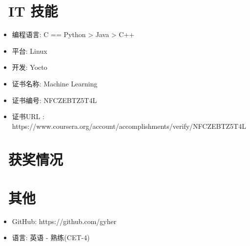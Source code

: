 \documentclass{resume}
\begin{document}


\section{\faCogs\ IT 技能}
\begin{itemize}[parsep=0.5ex]
  \item 编程语言: C == Python > Java > C++
  \item 平台: Linux
  \item 开发: Yocto
\end{itemize}
\begin{itemize}[parsep=0.5ex]
	\item 证书名称: Machine Learning
	\item 证书编号: NFCZEBTZ5T4L
	\item 证书URL : https://www.coursera.org/account/accomplishments/verify/NFCZEBTZ5T4L
\end{itemize}


\section{\faHeartO\ 获奖情况}

\section{\faInfo\ 其他}
\begin{itemize}[parsep=0.5ex]
  \item GitHub: https://github.com/gyher
  \item 语言: 英语 - 熟练(CET-4)
\end{itemize}

%
%
\end{document}
